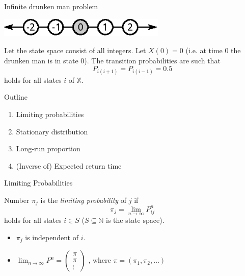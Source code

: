 \documentclass{beamer}
\begin{document}
\begin{frame}{Infinite drunken man problem}
	\begin{center}
	\includegraphics[width=0.6\textwidth]{infinite_drunken}
	\end{center}
	Let the state space consist of all integers.
	Let $X(0) = 0$ (i.e. at time 0 the drunken man is in state 0).
	The transition probabilities are such that
	\[
	P_{i(i+1)} = P_{i(i-1)} = 0.5
	\]
	holds for all states $i$ of $\mathbb{X}$.
\end{frame}

\begin{frame}{Outline}
	\begin{enumerate}
		\item Limiting probabilities
		\item Stationary distribution
		\item Long-run proportion
		\item (Inverse of) Expected return time
	\end{enumerate}
\end{frame}

\begin{frame}{Limiting Probabilities}
	\begin{definition}
		Number $\pi_j$ is the \textit{limiting probability} of $j$ if
		\[
		\pi_j = \lim_{n \to \infty} P^n_{ij}
		\]
		holds for all states $i \in S$ ($S \subseteq \mathbb{N}$ is the state space).
	\end{definition}
	\begin{itemize}
		\item $\pi_j$ is independent of $i$.
		\item $\lim_{n \to \infty} P^n = 
			\begin{pmatrix}
				\pi \\
				\pi \\
				\vdots
			\end{pmatrix}$
			, where $\pi = (\pi_1, \pi_2, \ldots)$
	\end{itemize}
\end{frame}
\end{document}
